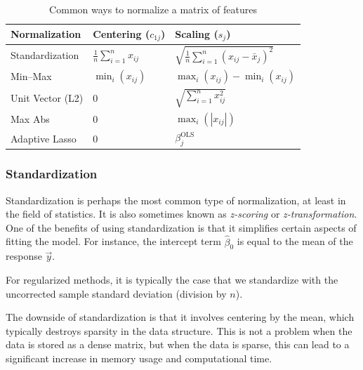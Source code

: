 \begin{table}[hbt]
  \centering
  \caption{Common ways to normalize a matrix of features}
  \label{tab:normalization-types}
  \begin{tabular}{lll}
    \toprule
    Normalization    & Centering (\(c_{1j}\))             & Scaling (\(s_j\))                                         \\
    \midrule
    Standardization  & \(\frac{1}{n}\sum_{i=1}^n x_{ij}\) & \(\sqrt{\frac{1}{n}\sum_{i=1}^n (x_{ij} - \bar{x}_j)^2}\) \\
    \addlinespace
    Min--Max         & \(\min_i(x_{ij})\)                 & \(\max_i(x_{ij}) - \min_i(x_{ij})\)                       \\
    \addlinespace
    Unit Vector (L2) & 0                                  & \(\sqrt{\sum_{i=1}^n x_{ij}^2}\)                          \\
    \addlinespace
    Max Abs          & 0                                  & \(\max_i(|x_{ij}|)\)                                      \\
    \addlinespace
    Adaptive Lasso   & 0                                  & \(\beta_j^\text{OLS}\)                                    \\
    \bottomrule
  \end{tabular}
\end{table}

\subsubsection{Standardization}

Standardization is perhaps the most common type of normalization, at least in the field of statistics. It is also sometimes known as \emph{z-scoring} or \emph{z-transformation}. One of the benefits of using standardization is that it simplifies certain aspects of fitting the model. For instance, the intercept term \(\hat\beta_0\) is equal to the mean of the response \(\vec y\).

For regularized methods, it is typically the case that we standardize with the uncorrected sample standard deviation (division by \(n\)).

The downside of standardization is that it involves centering by the mean, which typically destroys sparsity in the data structure. This is not a problem when the data is stored as a dense matrix, but when the data is sparse, this can lead to a significant increase in memory usage and computational time.

